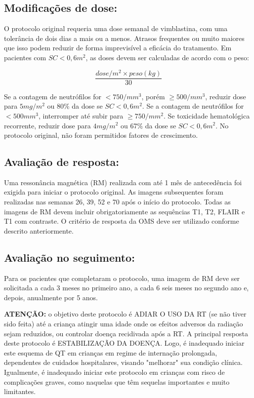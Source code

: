 \documentclass[11pt,a4paper,oldfontcommands]{memoir}
\begin{document}
\subsection{Modificações de dose:}
O protocolo original requeria uma dose semanal de vimblastina, com uma tolerância de dois dias a mais ou a menos. Atrasos frequentes ou muito maiores que isso podem reduzir de forma imprevisível a eficácia do tratamento. Em pacientes com \(SC < 0,6 m^2\), as doses devem ser calculadas de acordo com o peso: 

\[\frac{dose/m^2 \times peso(kg)}{30}\] 

Se a contagem de neutrófilos for $< 750/mm^3$, porém $\geq 500/mm^3$, reduzir dose para $5 mg/m^2$ ou 80\% da dose se $SC < 0,6 m^2$. Se a contagem de neutrófilos for $< 500mm^3$, interromper até subir para $\geq 750/mm^2$. Se toxicidade hematológica recorrente, reduzir dose para $4 mg/m^2$ ou 67\% da dose se $SC < 0,6 m^2$. No protocolo original, não foram permitidos fatores de crescimento.

\subsection{Avaliação de resposta:}

Uma ressonância magnética (RM) realizada com até 1 mês de antecedência foi exigida para iniciar o protocolo original. As imagens subsequentes foram realizadas nas semanas 26, 39, 52 e 70 após o início do protocolo. Todas as imagens de RM devem incluir obrigatoriamente as sequências T1, T2, FLAIR e T1 com contraste. O critério de resposta da OMS deve ser utilizado conforme descrito anteriormente.

\subsection{Avaliação no seguimento:}

Para os pacientes que completaram o protocolo, uma imagem de RM deve ser solicitada a cada 3 meses no primeiro ano, a cada 6 seis meses no segundo ano e, depois, anualmente por 5 anos. 

\textbf{ATENÇÃO:} o objetivo deste protocolo é ADIAR O USO DA RT (se não tiver sido feita) até a criança atingir uma idade onde os efeitos adversos da radiação sejam reduzidos, ou controlar doença recidivada após a RT. A principal resposta deste protocolo é ESTABILIZAÇÃO DA DOENÇA. Logo, é inadequado iniciar este esquema de QT em crianças em regime de internação prolongada, dependentes de cuidados hospitalares, visando "melhorar" sua condição clínica. Igualmente, é inadequado iniciar este protocolo em crianças com risco de complicações graves, como naquelas que têm sequelas importantes e muito limitantes.
\clearpage
\end{document}

